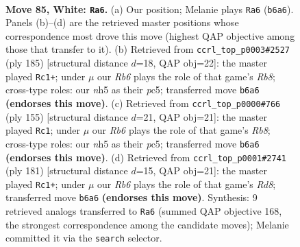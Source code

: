 \documentclass[11pt]{article}
\begin{document}
\clearpage

\begin{figure}[p]\centering
\begin{subfigure}{0.46\textwidth}\centering
\resizebox{\linewidth}{!}{%
\newchessgame
\chessboard[
  setfen={2k5/8/1R6/7n/p6r/P6p/7K/8 w - - 28 85},
  showmover=false,
  pgfstyle=straightmove, color=movearrow, markmove={b6-a6}
]}
\caption{}
\end{subfigure}\hfill
\begin{subfigure}{0.46\textwidth}\centering
\resizebox{\linewidth}{!}{%
\newchessgame
\chessboard[
  setfen={8/k7/P7/R1P5/2K5/8/8/1r6 b - - 26 93},
  showmover=false,
  pgfstyle=straightmove, color=movearrow, markmove={b1-c1}
]}
\caption{}
\end{subfigure}
\\[4pt]
\begin{subfigure}{0.46\textwidth}\centering
\resizebox{\linewidth}{!}{%
\newchessgame
\chessboard[
  setfen={8/k7/P1K5/R1P5/8/8/8/1r6 b - - 18 78},
  showmover=false,
  pgfstyle=straightmove, color=movearrow, markmove={b1-c1}
]}
\caption{}
\end{subfigure}\hfill
\begin{subfigure}{0.46\textwidth}\centering
\resizebox{\linewidth}{!}{%
\newchessgame
\chessboard[
  setfen={8/6k1/4R1P1/2K5/4P3/8/8/3r4 b - - 58 91},
  showmover=false,
  pgfstyle=straightmove, color=movearrow, markmove={d1-c1}
]}
\caption{}
\end{subfigure}
\caption{\textbf{Move 85, White: \texttt{Ra6}.} (a) Our position; Melanie plays \texttt{Ra6} (\texttt{b6a6}). Panels (b)--(d) are the retrieved master positions whose correspondence most drove this move (highest QAP objective among those that transfer to it). (b) Retrieved from \texttt{ccrl\_top\_p0003\#2527} (ply 185) [structural distance $d$=18, QAP obj=22]: the master played \texttt{Rc1+}; under $\mu$ our \emph{Rb6} plays the role of that game's \emph{Rb8}; cross-type roles: our \emph{n}h5 as their \emph{p}c5; transferred move \texttt{b6a6} \textbf{(endorses this move)}. (c) Retrieved from \texttt{ccrl\_top\_p0000\#766} (ply 155) [structural distance $d$=21, QAP obj=21]: the master played \texttt{Rc1}; under $\mu$ our \emph{Rb6} plays the role of that game's \emph{Rb8}; cross-type roles: our \emph{n}h5 as their \emph{p}c5; transferred move \texttt{b6a6} \textbf{(endorses this move)}. (d) Retrieved from \texttt{ccrl\_top\_p0001\#2741} (ply 181) [structural distance $d$=15, QAP obj=21]: the master played \texttt{Rc1+}; under $\mu$ our \emph{Rb6} plays the role of that game's \emph{Rd8}; transferred move \texttt{b6a6} \textbf{(endorses this move)}. Synthesis: 9 retrieved analogs transferred to \texttt{Ra6} (summed QAP objective 168, the strongest correspondence among the candidate moves); Melanie committed it via the \texttt{search} selector.}
\label{fig:thought-m168}
\end{figure}
\end{document}
